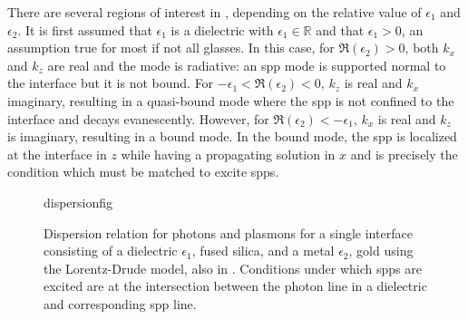 There are several regions of interest in ,
depending on the relative value of $\epsilon_1$ and $\epsilon_2$.  It is
first assumed that $\epsilon_1$ is a dielectric with
$\epsilon_1\in\mathbb{R}$ and that $\epsilon_1 > 0$, an assumption true for
most if not all glasses.  In this case, for $\Re(\epsilon_2)>0$, both $k_x$
and $k_z$ are real and the mode is radiative: an \gls{spp} mode is supported
normal to the interface but it is not bound.  For
$-\epsilon_1<\Re(\epsilon_2)<0$, $k_z$ is real and $k_x$ imaginary,
resulting in a quasi-bound mode where the \gls{spp} is not confined to the
interface and decays evanescently.  However, for
$\Re(\epsilon_2)<-\epsilon_1$, $k_x$ is real and $k_z$ is imaginary,
resulting in a bound mode.  In the bound mode, the \gls{spp} is localized at the
interface in $z$ while having a propagating solution in $x$ and is
precisely the condition which must be matched to excite \glspl{spp}.
\begin{figure}[ht]
  \centering
  {dispersionfig}
  \caption{Dispersion relation for photons and plasmons for a single interface consisting of a dielectric $\epsilon_1$, fused silica, and a metal $\epsilon_2$, gold using the Lorentz-Drude model, also in . Conditions under which \glspl{spp} are excited are at the intersection between the photon line in a dielectric and corresponding \gls{spp} line.}
  \label{fig:dispersionrelation}
\end{figure}
